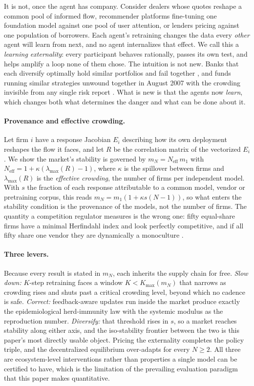 \documentclass{article}
\theoremstyle{plain}
\theoremstyle{definition}
\newcommand{\Neff}{N_{\mathrm{eff}}}
\newcommand{\mN}{m_N}
\newcommand{\lmax}{\lambda_{\max}}
\begin{document}
It is not, once the agent has company. Consider dealers whose quotes reshape a common pool of informed flow, recommender platforms fine-tuning one foundation model against one pool of user attention, or lenders pricing against one population of borrowers. Each agent's retraining changes the data every \emph{other} agent will learn from next, and no agent internalizes that effect. We call this a \emph{learning externality}: every participant behaves rationally, passes its own test, and helps amplify a loop none of them chose. The intuition is not new. Banks that each diversify optimally hold similar portfolios and fail together \citep{beale2011,wagner2010}, and funds running similar strategies unwound together in August 2007 with the crowding invisible from any single risk report \citep{khandani2007}. What is new is that the agents now \emph{learn}, which changes both what determines the danger and what can be done about it.

\paragraph{Provenance and effective crowding.}
Let firm $i$ have a response Jacobian $E_i$ describing how its own deployment reshapes the flow it faces, and let $R$ be the correlation matrix of the vectorized $E_i$. We show the market's stability is governed by $\mN = \Neff\, m_1$ with $\Neff = 1 + \kappa(\lmax(R)-1)$, where $\kappa$ is the spillover between firms and $\lmax(R)$ is the \emph{effective crowding}, the number of firms per independent model. With $s$ the fraction of each response attributable to a common model, vendor or pretraining corpus, this reads $\mN = m_1(1 + \kappa s (N-1))$, so what enters the stability condition is the provenance of the models, not the number of firms. The quantity a competition regulator measures is the wrong one: fifty equal-share firms have a minimal Herfindahl index and look perfectly competitive, and if all fifty share one vendor they are dynamically a monoculture \citep{hirschman1964}.

\paragraph{Three levers.}
Because every result is stated in $\mN$, each inherits the supply chain for free. \emph{Slow down:} $K$-step retraining faces a window $K < K_{\max}(\mN)$ that narrows as crowding rises and shuts past a critical crowding level, beyond which no cadence is safe. \emph{Correct:} feedback-aware updates \citep{izzo2021} run inside the market produce exactly the epidemiological herd-immunity law with the systemic modulus as the reproduction number. \emph{Diversify:} that threshold rises in $s$, so a market reaches stability along either axis, and the iso-stability frontier between the two is this paper's most directly usable object. Pricing the externality completes the policy triple, and the decentralized equilibrium over-adapts for every $N \geq 2$. All three are ecosystem-level interventions rather than properties a single model can be certified to have, which is the limitation of the prevailing evaluation paradigm that this paper makes quantitative.
\end{document}
